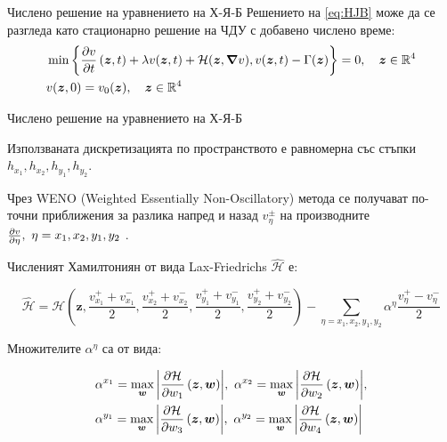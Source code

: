 \begin{frame}[t]{Числено решение на уравнението на Х-Я-Б}
  Решението на \eqref{eq:HJB} може да се разгледа като стационарно решение на ЧДУ с добавено числено време:
  \begin{equation}
    \label{eq:HJBTime}
    \begin{split}
      &\min\left\{\pdv{v}{t}\left(\boldsymbol{z}, t\right) + \lambda v(\boldsymbol{z}, t) + \mathcal{H}(\boldsymbol{z}, \grad{v}), v(\boldsymbol{z}, t) - \Gamma(\boldsymbol{z})\right\} = 0, \quad \boldsymbol{z} \in \mathbb{R}^4 \\
      &v(\boldsymbol{z}, 0) = v_0(\boldsymbol{z}), \quad \boldsymbol{z} \in \mathbb{R}^4 \\
    \end{split}
  \end{equation}
  \end{frame}

  \begin{frame}[t]{Числено решение на уравнението на Х-Я-Б}

Използваната дискретизацията по пространството е равномерна със стъпки $h_{x_1}, h_{x_2}, h_{y_1}, h_{y_2}$.

  Чрез WENO (Weighted Essentially Non-Oscillatory) метода се получават по-точни приближения за разлика напред и назад $v_{\eta}^{\pm}$ на производните $\pdv{v}{\eta},~ \eta = x_1, x_2, y_1, y_2$ \cite{Osher2003}.

  Численият Хамилтониян от вида Lax-Friedrichs $\hat{\mathcal{H}}$ е:
  \begin{small}
    \begin{equation*}
      \hat{\mathcal{H}} = \mathcal{H}\left(\boldsymbol{z}, \frac{v_{x_1}^++v_{x_1}^-}{2}, \frac{v_{x_2}^++v_{x_2}^-}{2}, \frac{v_{y_1}^++v_{y_1}^-}{2}, \frac{v_{y_2}^++v_{y_2}^-}{2}\right) - \sum_{\eta = x_1, x_2, y_1, y_2} \alpha^{\eta} \frac{v_{\eta}^+-v_{\eta}^-}{2}
    \end{equation*}
  \end{small}
  Множителите $\alpha^{\eta}$ са от вида:
  \begin{small}
    \begin{equation*}
      \begin{split}
        &\alpha^{x_1} = \max_{\boldsymbol{w}} \abs{\pdv{\mathcal{H}}{w_1}\left(\boldsymbol{z}, \boldsymbol{w}\right)},~
        \alpha^{x_2} = \max_{\boldsymbol{w}} \abs{\pdv{\mathcal{H}}{w_2}\left(\boldsymbol{z}, \boldsymbol{w}\right)}, \\
        &\alpha^{y_1} = \max_{\boldsymbol{w}} \abs{\pdv{\mathcal{H}}{w_3}\left(\boldsymbol{z}, \boldsymbol{w}\right)},~
        \alpha^{y_2} = \max_{\boldsymbol{w}} \abs{\pdv{\mathcal{H}}{w_4}\left(\boldsymbol{z}, \boldsymbol{w}\right)}
      \end{split}
    \end{equation*}
  \end{small}
\end{frame}

